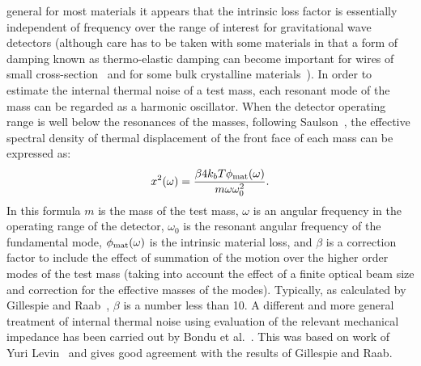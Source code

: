 \documentclass{article}
\begin{document}
general for most materials it appears that the intrinsic loss factor
is essentially independent of frequency over the range of interest for
gravitational wave detectors (although care has to be taken with some
materials in that a form of damping known as thermo-elastic damping
can become important for wires of small cross-section~\cite{Nowick}
and for some bulk crystalline materials~\cite{Bragthermo}). In order
to estimate the internal thermal noise of a test mass, each resonant
mode of the mass can be regarded as a harmonic oscillator. When the
detector operating range is well below the resonances of the masses,
following Saulson~\cite{Saulson2}, the effective spectral density of
thermal displacement of the front face of each mass can be expressed as:
%
\begin{equation}
  x^{2}(\omega) = \frac{\beta 4 k_{b} T \phi_{\rm mat}(\omega)}{m
  \omega \omega_{0}^{2}}.
  \label{equation:spectraldensity}
\end{equation}
%
In this formula $m$ is the mass of the test mass, $\omega $ is an
angular frequency in the operating range of the detector, $\omega_{0}$
is the resonant angular frequency of the fundamental mode, 
$\phi_{\rm mat}(\omega)$ is the intrinsic material loss, and $\beta$
is a correction factor to include the effect of summation of the
motion over the higher order modes of the test mass (taking into
account the effect of a finite optical beam size and correction for
the effective masses of the modes). Typically, as calculated by
Gillespie and Raab~\cite{Gillespie}, $\beta$ is a number less than
10. A different and more general treatment of internal thermal noise
using evaluation of the relevant mechanical impedance has been carried
out by Bondu et al.~\cite{Bondu}. This was based on work of Yuri
Levin~\cite{Levin} and gives good agreement with the results of
Gillespie and Raab.
\end{document}
